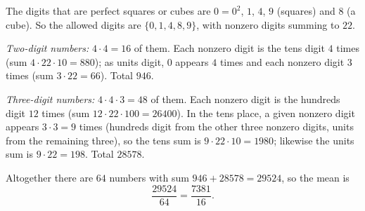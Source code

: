 The digits that are perfect squares or cubes are \(0=0^2\), \(1\), \(4\), \(9\) (squares) and \(8\) (a cube). So the allowed digits are \(\{0,1,4,8,9\}\), with nonzero digits summing to \(22\).

\emph{Two-digit numbers:} \(4\cdot4=16\) of them. Each nonzero digit is the tens digit \(4\) times (sum \(4\cdot22\cdot10=880\)); as units digit, \(0\) appears \(4\) times and each nonzero digit \(3\) times (sum \(3\cdot22=66\)). Total \(946\).

\emph{Three-digit numbers:} \(4\cdot4\cdot3=48\) of them. Each nonzero digit is the hundreds digit \(12\) times (sum \(12\cdot22\cdot100=26400\)). In the tens place, a given nonzero digit appears \(3\cdot3=9\) times (hundreds digit from the other three nonzero digits, units from the remaining three), so the tens sum is \(9\cdot22\cdot10=1980\); likewise the units sum is \(9\cdot22=198\). Total \(28578\).

Altogether there are \(64\) numbers with sum \(946+28578=29524\), so the mean is
\[
\dfrac{29524}{64}=\boxed{\dfrac{7381}{16}}.
\]
